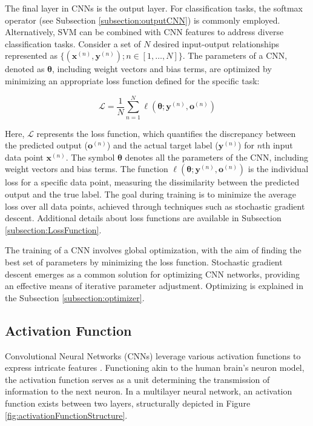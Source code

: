 The final layer in CNNs is the output layer. For classification tasks, the softmax operator (see Subsection \ref{subsection:outputCNN}) is commonly employed. Alternatively, SVM can be combined with CNN features to address diverse classification tasks. Consider a set of $N$ desired input-output relationships represented as $\{(\mathbf{x}^{(n)}, \mathbf{y}^{(n)}); n \in [1, \ldots, N]\}$. The parameters of a CNN, denoted as $\mathbf{\theta}$, including weight vectors and bias terms, are optimized by minimizing an appropriate loss function defined for the specific task:

\begin{equation}
	\mathcal{L} = \frac{1}{N} \sum_{n=1}^{N} \ell(\mathbf{\theta}; \mathbf{y}^{(n)}, \mathbf{o}^{(n)})
\end{equation}

Here, $\mathcal{L}$ represents the loss function, which quantifies the discrepancy between the predicted output ($\mathbf{o}^{(n)}$) and the actual target label ($\mathbf{y}^{(n)}$) for $n$th input data point $\mathbf{x}^{(n)}$. The symbol $\mathbf{\theta}$ denotes all the parameters of the CNN, including weight vectors and bias terms. The function $\ell(\mathbf{\theta}; \mathbf{y}^{(n)}, \mathbf{o}^{(n)})$ is the individual loss for a specific data point, measuring the dissimilarity between the predicted output and the true label. The goal during training is to minimize the average loss over all data points, achieved through techniques such as stochastic gradient descent. Additional details about loss functions are available in Subsection \ref{subsection:LossFunction}.

The training of a CNN involves global optimization, with the aim of finding the best set of parameters by minimizing the loss function. Stochastic gradient descent emerges as a common solution for optimizing CNN networks, providing an effective means of iterative parameter adjustment. Optimizing is explained in the Subsection \ref{subsection:optimizer}. 

\subsection{Activation Function}
\label{subsection:ActivationFunction}

Convolutional Neural Networks (CNNs) leverage various activation functions to express intricate features \cite{Li:2021}. Functioning akin to the human brain's neuron model, the activation function serves as a unit determining the transmission of information to the next neuron. In a multilayer neural network, an activation function exists between two layers, structurally depicted in Figure \ref{fig:activationFunctionStructure}.

